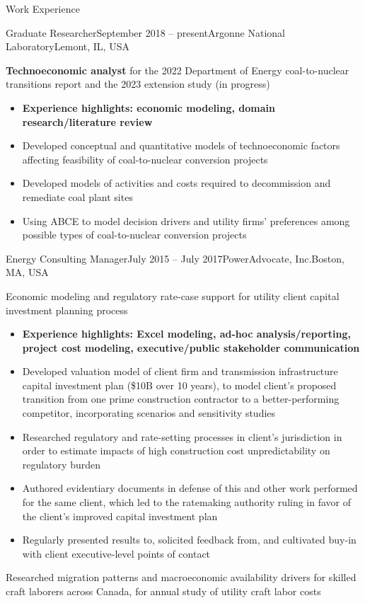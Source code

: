 \documentclass{resume} %
\begin{document}
\begin{rSection}{Work Experience}
\begin{rSubsection}{Graduate Researcher}{September 2018 -- present}{Argonne National Laboratory}{Lemont, IL, USA}
  \item \textbf{Technoeconomic analyst} for the 2022 Department of Energy coal-to-nuclear transitions report and the 2023 extension study (in progress)
  \begin{itemize}
    \setlength{\itemsep}{-3pt}
    \item \textbf{Experience highlights: economic modeling, domain research/literature review}
    \item Developed conceptual and quantitative models of technoeconomic factors affecting feasibility of coal-to-nuclear conversion projects
    \item Developed models of activities and costs required to decommission and remediate coal plant sites
    \item Using ABCE to model decision drivers and utility firms' preferences among possible types of coal-to-nuclear conversion projects
  \end{itemize}

\end{rSubsection}


\begin{rSubsection}{Energy Consulting Manager}{July 2015 -- July 2017}{PowerAdvocate, Inc.}{Boston, MA, USA}
  \setlength{\itemsep}{-3pt}
  \item Economic modeling and regulatory rate-case support for utility client capital investment planning process
  \begin{itemize}
    \item \textbf{Experience highlights: Excel modeling, ad-hoc analysis/reporting, project cost modeling, executive/public stakeholder communication}
    \item Developed valuation model of client firm and transmission infrastructure capital investment plan (\$10B over 10 years), to model client's proposed transition from one prime construction contractor to a better-performing competitor, incorporating scenarios and sensitivity studies
    \item Researched regulatory and rate-setting processes in client's jurisdiction in order to estimate impacts of high construction cost unpredictability on regulatory burden
    \item Authored evidentiary documents in defense of this and other work performed for the same client, which led to the ratemaking authority ruling in favor of the client's improved capital investment plan
    \item Regularly presented results to, solicited feedback from, and cultivated buy-in with client executive-level points of contact
  \end{itemize}
  \item Researched migration patterns and macroeconomic availability drivers for skilled craft laborers across Canada, for annual study of utility craft labor costs
\end{rSubsection}


\end{rSection}
\end{document}
